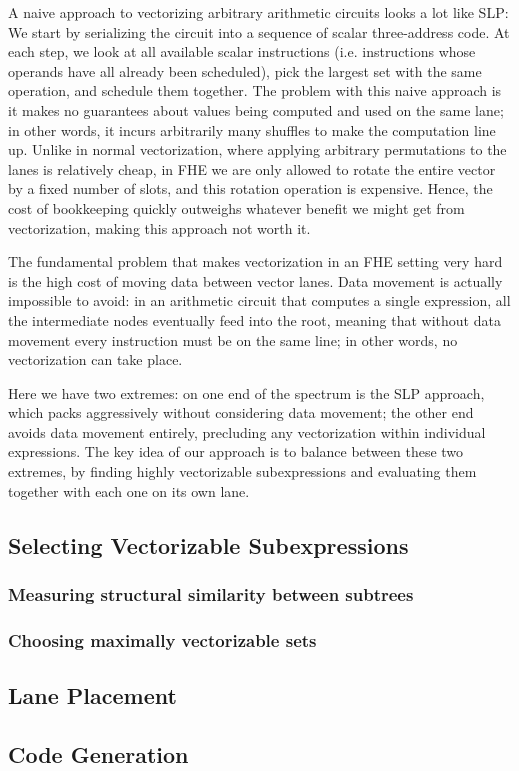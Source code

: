 A naive approach to vectorizing arbitrary arithmetic circuits looks a lot like SLP: We start by serializing the circuit into a sequence of scalar three-address code.
At each step, we look at all available scalar instructions (i.e. instructions whose operands have all already been scheduled), pick the largest set with the same operation, and schedule them together.
The problem with this naive approach is it makes no guarantees about values being computed and used on the same lane; in other words, it incurs arbitrarily many shuffles to make the computation line up. 
Unlike in normal vectorization, where applying arbitrary permutations to the lanes is relatively cheap, in FHE we are only allowed to rotate the entire vector by a fixed number of slots, and this rotation operation is expensive.
Hence, the cost of bookkeeping quickly outweighs whatever benefit we might get from vectorization, making this approach not worth it.

The fundamental problem that makes vectorization in an FHE setting very hard is the high cost of moving data between vector lanes. 
Data movement is actually impossible to avoid: in an arithmetic circuit that computes a single expression, all the intermediate nodes eventually feed into the root, meaning that without data movement every instruction must be on the same line; in other words, no vectorization can take place.

Here we have two extremes: on one end of the spectrum is the SLP approach, which packs aggressively without considering data movement; the other end avoids data movement entirely, precluding any vectorization within individual expressions.
The key idea of our approach is to balance between these two extremes, by finding highly vectorizable subexpressions and evaluating them together with each one on its own lane.

\subsection{Selecting Vectorizable Subexpressions}
\subsubsection*{Measuring structural similarity between subtrees}
\subsubsection*{Choosing maximally vectorizable sets}
\subsection{Lane Placement}
\subsection{Code Generation}
